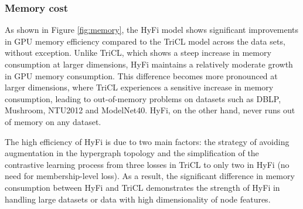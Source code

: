 \subsubsection{Memory cost}

As shown in Figure \ref{fig:memory}, the HyFi model shows significant improvements in GPU memory efficiency compared to the TriCL model across the data sets, without exception. Unlike TriCL, which shows a steep increase in memory consumption at larger dimensions, HyFi maintains a relatively moderate growth in GPU memory consumption. This difference becomes more pronounced at larger dimensions, where TriCL experiences a sensitive increase in memory consumption, leading to out-of-memory problems on datasets such as DBLP, Mushroom, NTU2012 and ModelNet40. HyFi, on the other hand, never runs out of memory on any dataset.

The high efficiency of HyFi is due to two main factors: the strategy of avoiding augmentation in the hypergraph topology and the simplification of the contrastive learning process from three losses in TriCL to only two in HyFi (no need for membership-level loss). As a result, the significant difference in memory consumption between HyFi and TriCL demonstrates the strength of HyFi in handling large datasets or data with high dimensionality of node features.




